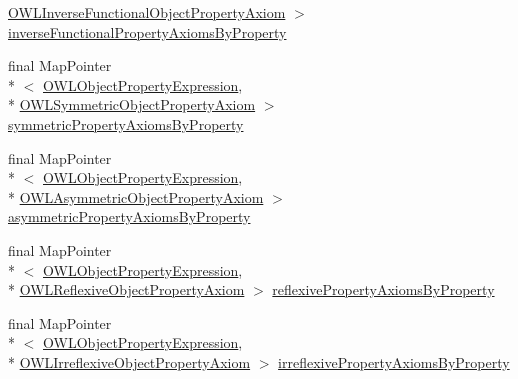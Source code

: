 \begin{DoxyCompactItemize}
\hyperlink{interfaceorg_1_1semanticweb_1_1owlapi_1_1model_1_1_o_w_l_inverse_functional_object_property_axiom}{O\-W\-L\-Inverse\-Functional\-Object\-Property\-Axiom} $>$ \hyperlink{classuk_1_1ac_1_1manchester_1_1cs_1_1owl_1_1owlapi_1_1_abstract_internals_impl_a2aacaf09a34ac2532a44ccaa7bbc24e2}{inverse\-Functional\-Property\-Axioms\-By\-Property}
\item 
final Map\-Pointer\\*
$<$ \hyperlink{interfaceorg_1_1semanticweb_1_1owlapi_1_1model_1_1_o_w_l_object_property_expression}{O\-W\-L\-Object\-Property\-Expression}, \\*
\hyperlink{interfaceorg_1_1semanticweb_1_1owlapi_1_1model_1_1_o_w_l_symmetric_object_property_axiom}{O\-W\-L\-Symmetric\-Object\-Property\-Axiom} $>$ \hyperlink{classuk_1_1ac_1_1manchester_1_1cs_1_1owl_1_1owlapi_1_1_abstract_internals_impl_a8a15718e35cef2f64037bd8c70ee3f4a}{symmetric\-Property\-Axioms\-By\-Property}
\item 
final Map\-Pointer\\*
$<$ \hyperlink{interfaceorg_1_1semanticweb_1_1owlapi_1_1model_1_1_o_w_l_object_property_expression}{O\-W\-L\-Object\-Property\-Expression}, \\*
\hyperlink{interfaceorg_1_1semanticweb_1_1owlapi_1_1model_1_1_o_w_l_asymmetric_object_property_axiom}{O\-W\-L\-Asymmetric\-Object\-Property\-Axiom} $>$ \hyperlink{classuk_1_1ac_1_1manchester_1_1cs_1_1owl_1_1owlapi_1_1_abstract_internals_impl_ac37a3bedd042163b7af06c2de2da11f0}{asymmetric\-Property\-Axioms\-By\-Property}
\item 
final Map\-Pointer\\*
$<$ \hyperlink{interfaceorg_1_1semanticweb_1_1owlapi_1_1model_1_1_o_w_l_object_property_expression}{O\-W\-L\-Object\-Property\-Expression}, \\*
\hyperlink{interfaceorg_1_1semanticweb_1_1owlapi_1_1model_1_1_o_w_l_reflexive_object_property_axiom}{O\-W\-L\-Reflexive\-Object\-Property\-Axiom} $>$ \hyperlink{classuk_1_1ac_1_1manchester_1_1cs_1_1owl_1_1owlapi_1_1_abstract_internals_impl_a8b3dd3d7dbdb009140c163ba282463ab}{reflexive\-Property\-Axioms\-By\-Property}
\item 
final Map\-Pointer\\*
$<$ \hyperlink{interfaceorg_1_1semanticweb_1_1owlapi_1_1model_1_1_o_w_l_object_property_expression}{O\-W\-L\-Object\-Property\-Expression}, \\*
\hyperlink{interfaceorg_1_1semanticweb_1_1owlapi_1_1model_1_1_o_w_l_irreflexive_object_property_axiom}{O\-W\-L\-Irreflexive\-Object\-Property\-Axiom} $>$ \hyperlink{classuk_1_1ac_1_1manchester_1_1cs_1_1owl_1_1owlapi_1_1_abstract_internals_impl_a4115a6a77b6c2efb691891e6db630e32}{irreflexive\-Property\-Axioms\-By\-Property}

\end{DoxyCompactItemize}
